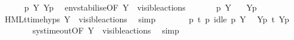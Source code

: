 \begin{isabellebody}
\isanewline
\ \ \ \ \isamarkupfalse%
\ {\isacartoucheopen}{\isasymtheta}{\isacharparenleft}{\kern0pt}p{\isacharparenright}{\kern0pt}\ {\isasymlongmapsto}\isactrlsup {\isasymtheta}{\isasymepsilon}{\isacharbrackleft}{\kern0pt}Y{\isacharbrackright}{\kern0pt}\ {\isasymtheta}{\isacharbrackleft}{\kern0pt}Y{\isacharbrackright}{\kern0pt}{\isacharparenleft}{\kern0pt}p{\isacharparenright}{\kern0pt}{\isacartoucheclose}\ \isamarkupfalse%
\ env{\isacharunderscore}{\kern0pt}stabilise{\isacharbrackleft}{\kern0pt}OF\ {\isacartoucheopen}Y\ {\isasymsubseteq}\ visible{\isacharunderscore}{\kern0pt}actions{\isacartoucheclose}{\isacharbrackright}{\kern0pt}\ \isacommand{{\isachardot}{\kern0pt}}\isamarkupfalse%
\isanewline
\isanewline
\ \ \ \ \isamarkupfalse%
\ {\isacartoucheopen}p{\isacharprime}{\kern0pt}\ {\isasymTTurnstile}{\isacharbrackleft}{\kern0pt}Y{\isacharbrackright}{\kern0pt}\ {\isasymphi}{\isacartoucheclose}\ \isamarkupfalse%
\ {\isacartoucheopen}{\isasymtheta}{\isacharbrackleft}{\kern0pt}Y{\isacharbrackright}{\kern0pt}{\isacharparenleft}{\kern0pt}p{\isacharprime}{\kern0pt}{\isacharparenright}{\kern0pt}\ {\isasymTurnstile}\ {\isasymsigma}{\isacharparenleft}{\kern0pt}{\isasymphi}{\isacharparenright}{\kern0pt}{\isacartoucheclose}\ \isamarkupfalse%
\ HMLt{\isacharunderscore}{\kern0pt}time{\isachardot}{\kern0pt}hyps\ {\isacartoucheopen}Y\ {\isasymsubseteq}\ visible{\isacharunderscore}{\kern0pt}actions{\isacartoucheclose}\ \isamarkupfalse%
\ simp\isanewline
\ \ \ \ \isamarkupfalse%
\ \isamarkupfalse%
\ {\isacartoucheopen}p\ {\isasymlongmapsto}t\ p{\isacharprime}{\kern0pt}{\isacartoucheclose}\ {\isacartoucheopen}idle\ p\ Y{\isacartoucheclose}\ \isamarkupfalse%
\ {\isacartoucheopen}{\isasymtheta}{\isacharbrackleft}{\kern0pt}Y{\isacharbrackright}{\kern0pt}{\isacharparenleft}{\kern0pt}p{\isacharparenright}{\kern0pt}\ {\isasymlongmapsto}\isactrlsup {\isasymtheta}t\ {\isasymtheta}{\isacharbrackleft}{\kern0pt}Y{\isacharbrackright}{\kern0pt}{\isacharparenleft}{\kern0pt}p{\isacharprime}{\kern0pt}{\isacharparenright}{\kern0pt}{\isacartoucheclose}\ \isanewline
\ \ \ \ \ \ \isamarkupfalse%
\ sys{\isacharunderscore}{\kern0pt}timeout{\isacharbrackleft}{\kern0pt}OF\ {\isacartoucheopen}Y\ {\isasymsubseteq}\ visible{\isacharunderscore}{\kern0pt}actions{\isacartoucheclose}{\isacharbrackright}{\kern0pt}\ \isamarkupfalse%
\ simp\isanewline
\ \ \ \ \isamarkupfalse%
\ \isamarkupfalse%

\end{isabellebody}
